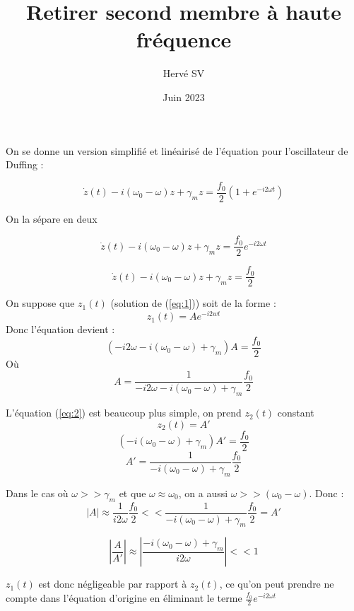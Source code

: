 \documentclass{article}
\title{Retirer second membre à haute fréquence}
\author{Hervé SV}
\date{Juin 2023}
\begin{document}
\maketitle

On se donne un version simplifié et linéairisé de l'équation pour l'oscillateur de Duffing :

\[ \dot{z}(t) -i (\omega_0 - \omega)z + \gamma_m z = \frac{f_0}{2} (1 + e^{-i2\omega t}) \]

On la sépare en deux

\begin{dmath}
    \label{eq:1}
    \dot{z}(t) -i (\omega_0 - \omega)z + \gamma_m z = \frac{f_0}{2}e^{-i2\omega t}
\end{dmath}

\begin{dmath}
    \label{eq:2}
    \dot{z}(t) - i (\omega_0 - \omega)z + \gamma_m z = \frac{f_0}{2}
\end{dmath}

On suppose que $z_1(t)$ (solution de (\ref{eq:1})) soit de la forme :
\[ z_1(t) = Ae^{-i2wt} \]
Donc l'équation devient :
\[ (-i2\omega - i(\omega_0 - \omega) + \gamma_m)A = \frac{f_0}{2} \]
Où
\[ A = \frac{1}{-i2\omega - i(\omega_0 - \omega) + \gamma_m}\frac{f_0}{2}  \]

L'équation (\ref{eq:2}) est beaucoup plus simple, on prend $z_2(t)$ constant
\[ z_2(t) = A' \]
\[ (- i(\omega_0 - \omega) + \gamma_m)A' = \frac{f_0}{2} \]
\[ A' = \frac{1}{- i(\omega_0 - \omega) + \gamma_m}\frac{f_0}{2}  \]

Dans le cas où $\omega >> \gamma_m$ et que $\omega \approx \omega_0$, on a aussi $\omega >> (\omega_0 - \omega)$. Donc :
\[ |A| \approx \frac{1}{i2\omega}\frac{f_0}{2}  << \frac{1}{- i(\omega_0 - \omega) + \gamma_m}\frac{f_0}{2} = A' \]

\[ |\frac{A}{A'}| \approx |\frac{- i(\omega_0 - \omega) + \gamma_m}{i2\omega}|  << 1 \]

$z_1(t)$ est donc négligeable par rapport à $z_2(t)$, ce qu'on peut prendre ne compte dans l'équation d'origine en éliminant le terme $\frac{f_0}{2}e^{-i2\omega t}$
\end{document}
